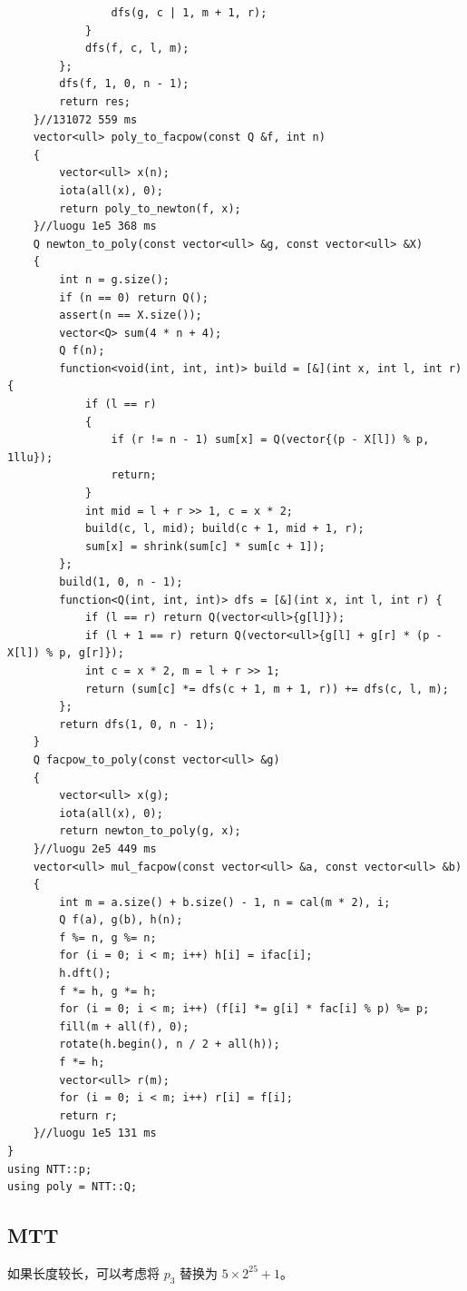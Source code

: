 \documentclass[12pt]{ctexart}
\begin{document}
\begin{lstlisting}
				dfs(g, c | 1, m + 1, r);
			}
			dfs(f, c, l, m);
		};
		dfs(f, 1, 0, n - 1);
		return res;
	}//131072 559 ms
	vector<ull> poly_to_facpow(const Q &f, int n)
	{
		vector<ull> x(n);
		iota(all(x), 0);
		return poly_to_newton(f, x);
	}//luogu 1e5 368 ms
	Q newton_to_poly(const vector<ull> &g, const vector<ull> &X)
	{
		int n = g.size();
		if (n == 0) return Q();
		assert(n == X.size());
		vector<Q> sum(4 * n + 4);
		Q f(n);
		function<void(int, int, int)> build = [&](int x, int l, int r) {
			if (l == r)
			{
				if (r != n - 1) sum[x] = Q(vector{(p - X[l]) % p, 1llu});
				return;
			}
			int mid = l + r >> 1, c = x * 2;
			build(c, l, mid); build(c + 1, mid + 1, r);
			sum[x] = shrink(sum[c] * sum[c + 1]);
		};
		build(1, 0, n - 1);
		function<Q(int, int, int)> dfs = [&](int x, int l, int r) {
			if (l == r) return Q(vector<ull>{g[l]});
			if (l + 1 == r) return Q(vector<ull>{g[l] + g[r] * (p - X[l]) % p, g[r]});
			int c = x * 2, m = l + r >> 1;
			return (sum[c] *= dfs(c + 1, m + 1, r)) += dfs(c, l, m);
		};
		return dfs(1, 0, n - 1);
	}
	Q facpow_to_poly(const vector<ull> &g)
	{
		vector<ull> x(g);
		iota(all(x), 0);
		return newton_to_poly(g, x);
	}//luogu 2e5 449 ms
	vector<ull> mul_facpow(const vector<ull> &a, const vector<ull> &b)
	{
		int m = a.size() + b.size() - 1, n = cal(m * 2), i;
		Q f(a), g(b), h(n);
		f %= n, g %= n;
		for (i = 0; i < m; i++) h[i] = ifac[i];
		h.dft();
		f *= h, g *= h;
		for (i = 0; i < m; i++) (f[i] *= g[i] * fac[i] % p) %= p;
		fill(m + all(f), 0);
		rotate(h.begin(), n / 2 + all(h));
		f *= h;
		vector<ull> r(m);
		for (i = 0; i < m; i++) r[i] = f[i];
		return r;
	}//luogu 1e5 131 ms
}
using NTT::p;
using poly = NTT::Q;

\end{lstlisting}


\subsection{MTT}

如果长度较长，可以考虑将 $p_3$ 替换为 $5\times 2^{25}+1$。
\end{document}
